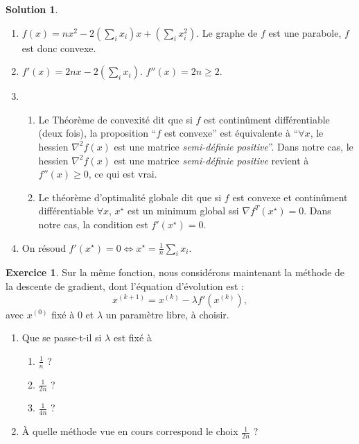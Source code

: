 \documentclass[a4paper,francais]{article}
\theoremstyle{definition}
\newtheorem{exercice}{Exercice}[section]
\newtheorem*{solution}{Solution}
\begin{document}
\begin{solution}
  \begin{enumerate}
  \item $f(x) = n x^2 - 2(\sum_ix_i)x + (\sum_ix_i^2)$.
    Le graphe de $f$ est une parabole, $f$ est donc convexe.  
  \item $f'(x) = 2n x - 2(\sum_ix_i)$. $f''(x) = 2n \geq 2$. 
  \item
    \begin{enumerate}
    \item Le Théorème de convexité dit que si $f$ est continûment différentiable (deux fois), 
      la proposition ``$f$ est convexe'' est équivalente à ``$\forall x$, le hessien $\nabla^2f(x)$
      est une matrice \emph{semi-définie positive}''. Dans notre cas, le hessien $\nabla^2f(x)$
      est une matrice \emph{semi-définie positive} revient à $f''(x) \geq 0$, ce qui est vrai.
    \item Le théorème d'optimalité globale dit que si $f$ est convexe et continûment différentiable
      $\forall x$, $x^\star$ est un minimum global ssi ${\nabla f}^T(x^\star) = 0$.
      Dans notre cas, la condition est $f'(x^\star) = 0$. 
    \end{enumerate}
  \item On résoud $f'(x^\star) = 0 \Leftrightarrow x^\star = \frac{1}{n}\sum_ix_i$.
  \end{enumerate}  
\end{solution}

\begin{exercice}  
  Sur la même fonction, nous considérons maintenant la méthode de la descente de gradient,
  dont l'équation d'évolution est :
  \[ x^{(k+1)} = x^{(k)} - \lambda f'(x^{(k)}), \]
  avec $x^{(0)}$ fixé à $0$ et $\lambda$ un paramètre libre, à choisir. 
  \begin{enumerate}
  \item Que se passe-t-il si $\lambda$ est fixé à
    \begin{enumerate}
    \item $\frac{1}{n}$ ?
    \item $\frac{1}{2n}$ ?
    \item $\frac{1}{4n}$ ?
    \end{enumerate}
  \item \`A quelle méthode vue en cours correspond le choix $\frac{1}{2n}$ ?
  \end{enumerate}
\end{exercice}
\end{document}
